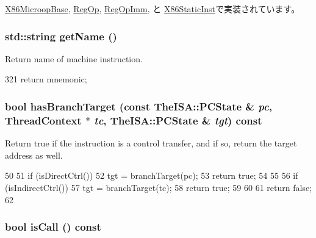 \hyperlink{classX86ISA_1_1X86MicroopBase_a95d323a22a5f07e14d6b4c9385a91896}{X86MicroopBase}, \hyperlink{classX86ISA_1_1RegOp_a95d323a22a5f07e14d6b4c9385a91896}{RegOp}, \hyperlink{classX86ISA_1_1RegOpImm_a95d323a22a5f07e14d6b4c9385a91896}{RegOpImm}, と \hyperlink{classX86ISA_1_1X86StaticInst_a95d323a22a5f07e14d6b4c9385a91896}{X86StaticInst}で実装されています。\hypertarget{classStaticInst_ac0fc966d4386ddb71d99361e3fccb311}{
\subsubsection[{getName}]{\setlength{\rightskip}{0pt plus 5cm}std::string getName ()}}
\label{classStaticInst_ac0fc966d4386ddb71d99361e3fccb311}


Return name of machine instruction. 


\begin{DoxyCode}
321 { return mnemonic; }
\end{DoxyCode}
\hypertarget{classStaticInst_a2db4eab463c2d474648251de42a1b5e6}{
\subsubsection[{hasBranchTarget}]{\setlength{\rightskip}{0pt plus 5cm}bool hasBranchTarget (const TheISA::PCState \& {\em pc}, \/  {\bf ThreadContext} $\ast$ {\em tc}, \/  TheISA::PCState \& {\em tgt}) const}}
\label{classStaticInst_a2db4eab463c2d474648251de42a1b5e6}
Return true if the instruction is a control transfer, and if so, return the target address as well. 


\begin{DoxyCode}
50 {
51     if (isDirectCtrl()) {
52         tgt = branchTarget(pc);
53         return true;
54     }
55 
56     if (isIndirectCtrl()) {
57         tgt = branchTarget(tc);
58         return true;
59     }
60 
61     return false;
62 }
\end{DoxyCode}
\hypertarget{classStaticInst_aa2317a020504e552097abb001847f74c}{
\subsubsection[{isCall}]{\setlength{\rightskip}{0pt plus 5cm}bool isCall () const}}
\label{classStaticInst_aa2317a020504e552097abb001847f74c}



